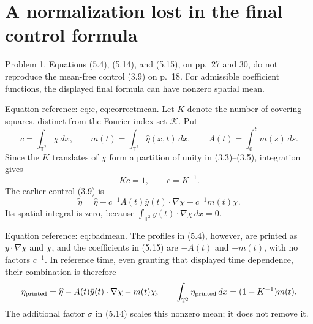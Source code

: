 \documentclass[10pt]{article}
\begin{document}
\section*{A normalization lost in the final control formula}
Problem 1.  Equations (5.4), (5.14), and (5.15), on pp. 27 and 30, do not reproduce the mean-free control (3.9) on p. 18. For admissible coefficient functions, the displayed final formula can have nonzero spatial mean.\par
Equation reference: eq:c, eq:correctmean. Let \(K\) denote the number of covering squares, distinct from the Fourier index set \(\mathcal K\). Put \[c=\int_{\mathbb T^2}\chi\,dx,\qquad m(t)=\int_{\mathbb T^2}\widehat\eta(x,t)\,dx,\qquad
 A(t)=\int_0^t m(s)\,ds .\] Since the \(K\) translates of \(\chi\) form a partition of unity in (3.3)–(3.5), integration gives \[Kc=1,\qquad c=K^{-1}.                                      \] The earlier control (3.9) is \[\widetilde\eta
 =\widehat\eta-c^{-1}A(t)\bar y(t)\cdot\nabla\chi
                  -c^{-1}m(t)\chi .                        \] Its spatial integral is zero, because \(\int_{\mathbb T^2}\bar y(t)\cdot\nabla\chi\,dx=0\).\par
Equation reference: eq:badmean. The profiles in (5.4), however, are printed as \(\bar y\cdot\nabla\chi\) and \(\chi\), and the coefficients in (5.15) are \(-A(t)\) and \(-m(t)\), with no factors \(c^{-1}\). In reference time, even granting that displayed time dependence, their combination is therefore \[\eta_{\rm printed}
 =\widehat\eta-A(t)\bar y(t)\cdot\nabla\chi-m(t)\chi,
 \qquad
 \int_{\mathbb T^2}\eta_{\rm printed}\,dx=(1-K^{-1})m(t).                     \] The additional factor \(\sigma\) in (5.14) scales this nonzero mean; it does not remove it.\par
\end{document}
